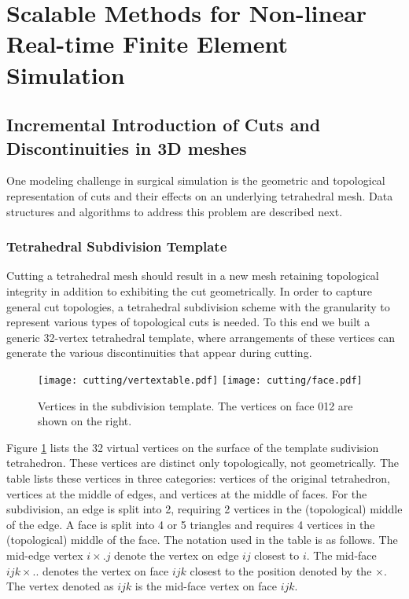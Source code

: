 
% 
\clearpage

\section{Scalable Methods for Non-linear Real-time Finite Element Simulation}\label{sec:fem_simulation}

\subsection{Incremental Introduction of Cuts and Discontinuities in 3D meshes}\label{ssec:discontinuous_fem}
One modeling challenge in surgical simulation is the geometric and topological representation of cuts and their effects on an underlying tetrahedral mesh. Data structures and algorithms to address this problem are described next.

\subsubsection{Tetrahedral Subdivision Template}

Cutting a tetrahedral mesh should result in a new mesh retaining topological integrity in addition to exhibiting the cut geometrically. In order to capture general cut topologies, a tetrahedral subdivision scheme with the granularity to represent various types of topological cuts is needed. To this end we built a generic 32-vertex tetrahedral template, where arrangements of these vertices can generate the various discontinuities that appear during cutting.

\begin{figure}
	\texttt{[image: cutting/vertextable.pdf]}
	\texttt{[image: cutting/face.pdf]}
	\caption{Vertices in the subdivision template. The vertices on face 012 are shown on the right.}
	\label{fig:vertices}
\end{figure}

Figure \ref{fig:vertices} lists the 32 virtual vertices on the surface of the template sudivision tetrahedron. These vertices are distinct only topologically, not geometrically. The table lists these vertices in three categories: vertices of the original tetrahedron, vertices at the middle of edges, and vertices at the middle of faces. For the subdivision, an edge is split into 2, requiring 2 vertices in the (topological) middle of the edge. A face is split into 4 or 5 triangles and requires 4 vertices in the (topological) middle of the face. The notation used in the table is as follows. The mid-edge vertex $i\times .j$ denote the vertex on edge $ij$ closest to $i$. The mid-face $ijk\times ..$ denotes the vertex on face $ijk$ closest to the position denoted by the $\times$. The vertex denoted as $ijk$ is the mid-face vertex on face $ijk$.

